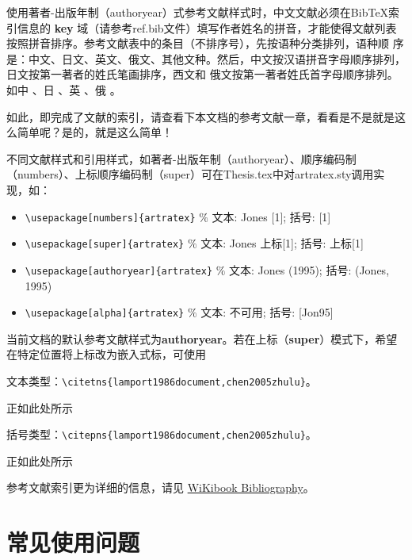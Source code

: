 使用著者-出版年制（authoryear）式参考文献样式时，中文文献必须在BibTeX索引信息的 \textbf{key} 域（请参考ref.bib文件）填写作者姓名的拼音，才能使得文献列表按照拼音排序。参考文献表中的条目（不排序号），先按语种分类排列，语种顺 序是：中文、日文、英文、俄文、其他文种。然后，中文按汉语拼音字母顺序排列，日文按第一著者的姓氏笔画排序，西文和 俄文按第一著者姓氏首字母顺序排列。如中 \citep{niu2013zonghe}、日 \citep{Bohan1928}、英 \citep{stamerjohanns2009mathml}、俄 \citep{Dubrovin1906}。

如此，即完成了文献的索引，请查看下本文档的参考文献一章，看看是不是就是这么简单呢？是的，就是这么简单！

不同文献样式和引用样式，如著者-出版年制（authoryear）、顺序编码制（numbers）、上标顺序编码制（super）可在Thesis.tex中对artratex.sty调用实现，如：
\begin{itemize}
    \footnotesize
    \item \verb+\usepackage[numbers]{artratex}+ $\%$ 文本: Jones [1]; 括号: [1]
    \item \verb+\usepackage[super]{artratex}+ $\%$ 文本: Jones 上标[1]; 括号: 上标[1]
    \item \verb+\usepackage[authoryear]{artratex}+ $\%$ 文本: Jones (1995); 括号: (Jones, 1995)
    \item \verb+\usepackage[alpha]{artratex}+ $\%$ 文本: 不可用; 括号: [Jon95]
\end{itemize}

当前文档的默认参考文献样式为\textbf{authoryear}。若在上标（\textbf{super}）模式下，希望在特定位置将上标改为嵌入式标，可使用

文本类型：\verb|\citetns{lamport1986document,chen2005zhulu}|。

正如此处所示 

括号类型：\verb|\citepns{lamport1986document,chen2005zhulu}|。

正如此处所示 

参考文献索引更为详细的信息，请见 \href{https://en.wikibooks.org/wiki/LaTeX/Bibliography_Management}{WiKibook Bibliography}。


\section{常见使用问题}\label{sec:qa}

